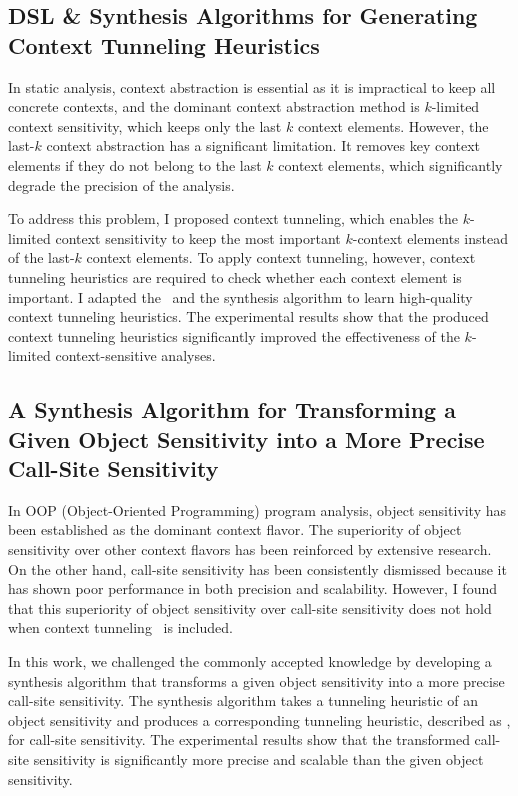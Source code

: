 \documentclass[11pt]{article}
\begin{document}
\subsection{DSL \& Synthesis Algorithms for Generating Context Tunneling Heuristics~\cite{JeJeOh18}}
%
In static analysis, context abstraction is essential as it is impractical to keep all concrete contexts, and the dominant context abstraction method is $k$-limited context sensitivity, which keeps only the last $k$ context elements.
%
However, the last-$k$ context abstraction has a significant limitation. 
%
It removes key context elements if they do not belong to the last $k$ context elements, which significantly degrade the precision of the analysis.




To address this problem, I proposed context tunneling, which enables the $k$-limited context sensitivity to keep the most important $k$-context elements instead of the last-$k$ context elements.
%
To apply context tunneling, however, context tunneling heuristics are required to check whether each context element is important.
%
I adapted the \DisjunctiveModel~and the synthesis algorithm to learn high-quality context tunneling heuristics.
%
The experimental results show that the produced context tunneling heuristics significantly improved the effectiveness of the $k$-limited context-sensitive analyses.



\subsection{A Synthesis Algorithm for Transforming a Given Object Sensitivity into a More Precise Call-Site Sensitivity~\cite{JeOh22}}
%
In OOP (Object-Oriented Programming) program analysis, object sensitivity has been established as the dominant context flavor.
%
The superiority of object sensitivity over other context flavors has been reinforced by extensive research.
%
On the other hand, call-site sensitivity has been consistently dismissed because it has shown poor performance in both precision and scalability.
%
However, I found that this superiority of object sensitivity over call-site sensitivity does not hold when context tunneling~\cite{JeJeOh18} is included. 


In this work, we challenged the commonly accepted knowledge by developing a synthesis algorithm that transforms a given object sensitivity into a more precise call-site sensitivity.
%
The synthesis algorithm takes a tunneling heuristic of an object sensitivity and produces a corresponding tunneling heuristic, described as \DisjunctiveModel, for call-site sensitivity.
%
The experimental results show that the transformed call-site sensitivity is significantly more precise and scalable than the given object sensitivity.
\end{document}
